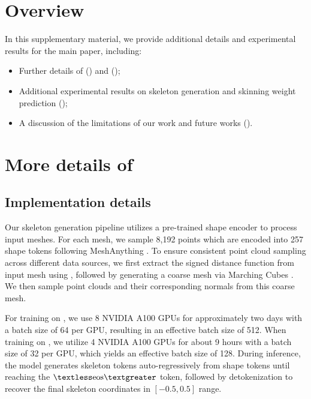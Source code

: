 \clearpage
\maketitlesupplementary


\renewcommand{\thetable}{S\arabic{table}}
\renewcommand{\thefigure}{S\arabic{figure}}


\section*{Overview}
In this supplementary material, we provide additional details and experimental results for the main paper, including:

\begin{itemize}
    \item Further details of \ours{} () and \ourdata{} ();
    \item Additional experimental results on skeleton generation and skinning weight prediction ();
    \item A discussion of the limitations of our work and future works ().
\end{itemize}


\section{More details of \ours{}}
\label{method_detail}

\subsection{Implementation details}
\label{implement_detail}
Our skeleton generation pipeline utilizes a pre-trained shape encoder \cite{zhao2024michelangelo} to process input meshes. For each mesh, we sample 8,192 points which are encoded into 257 shape tokens following MeshAnything \cite{chen2024meshanything}. To ensure consistent point cloud sampling across different data sources, we first extract the signed distance function from input mesh using \cite{wang2022dual}, followed by generating a coarse mesh via Marching Cubes \cite{lorensen1998marching}. We then sample point clouds and their corresponding normals from this coarse mesh.

For training on \ourdata{}, we use 8 NVIDIA A100 GPUs for approximately two days with a batch size of 64 per GPU, resulting in an effective batch size of 512. 
When training on \res{}, we utilize 4 NVIDIA A100 GPUs for about 9 hours with a batch size of 32 per GPU, which yields an effective batch size of 128.
During inference, the model generates skeleton tokens auto-regressively from shape tokens until reaching the $\textless \mathrm{eos} \textgreater$ token, followed by detokenization to recover the final skeleton coordinates in $[-0.5, 0.5]$ range.

